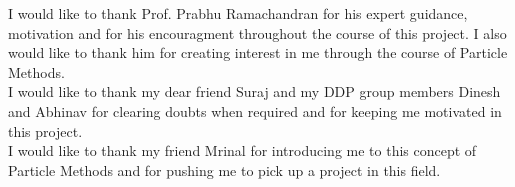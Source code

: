 \acknowledgments

I would like to thank Prof. Prabhu Ramachandran for his expert guidance, motivation and for his encouragment throughout the course of this project.
I also would like to thank him for creating interest in me through the course of Particle Methods.\\
\noindent
I would like to thank my dear friend Suraj and my DDP group members Dinesh and Abhinav for clearing doubts when required and for keeping me motivated in this  project.\\
\noindent
I would like to thank my friend Mrinal for introducing me to this concept of Particle Methods and for pushing me to pick up a project in this field.






\signature{\today}


